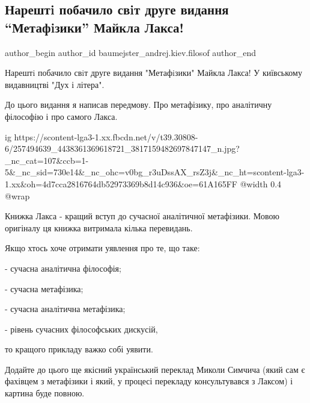  
 
 
 
 
 
\subsection{Нарештi побачило свiт друге видання \enquote{Метафiзики} Майкла Лакса!}
\label{sec:15_11_2021.fb.baumejster_andrej.kiev.filosof.1.metafizika_kniga}
 
\ifcmt
 author_begin
   author_id baumejster_andrej.kiev.filosof
 author_end
\fi

Нарештi побачило свiт друге видання "Метафiзики" Майкла Лакса! У київському
видавництві "Дух і літера". 

До цього видання я написав передмову. Про метафізику, про аналітичну філософію
і про самого Лакса. 

\ifcmt
  ig https://scontent-lga3-1.xx.fbcdn.net/v/t39.30808-6/257494639_4438361369618721_3817159482697847147_n.jpg?_nc_cat=107&ccb=1-5&_nc_sid=730e14&_nc_ohc=v0bg_r3uDssAX_rsZ3j&_nc_ht=scontent-lga3-1.xx&oh=4d7cca2816764db52973369b8d14c936&oe=61A165FF
  @width 0.4
  @wrap 
\fi

Книжка Лакса - кращий вступ до сучасної аналітичної метафізики. Мовою оригіналу
ця книжка витримала кілька перевидань. 

Якщо хтось хоче отримати уявлення про те, що таке: 

- сучасна аналітична філософія;

- сучасна метафізика;

- сучасна аналітична метафізика; 

- рівень сучасних філософських дискусій,

то кращого прикладу важко собі уявити.

Додайте до цього ще якісний український переклад Миколи Симчича (який сам є
фахівцем з метафізики і який, у процесі перекладу консультувався з Лаксом) і
картина буде повною.

